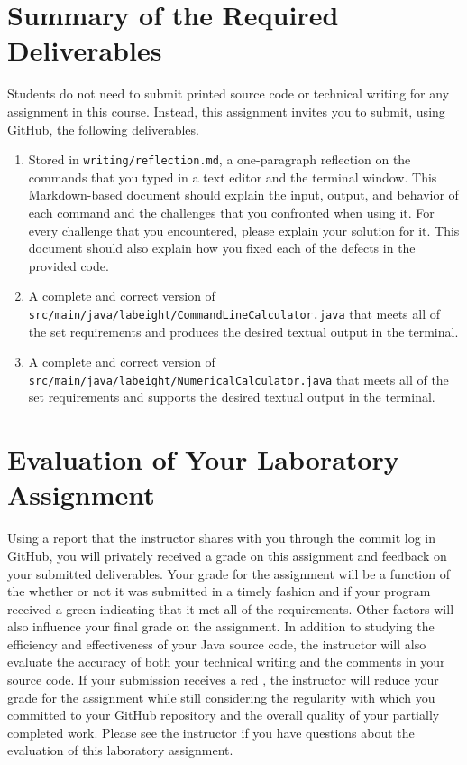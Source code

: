 \documentclass[11pt]{article}
\newcommand{\mainprogramsource}{\lstinline{src/main/java/labeight/CommandLineCalculator.java}}
\newcommand{\secondprogramsource}{\lstinline{src/main/java/labeight/NumericalCalculator.java}}
\newcommand{\reflection}{\lstinline{writing/reflection.md}}
\newcommand{\checkmark}{\ding{51}}
\newcommand{\naughtmark}{\ding{55}}
\begin{document}
\section*{Summary of the Required Deliverables}

\noindent Students do not need to submit printed source code or technical writing for any assignment in this course.
Instead, this assignment invites you to submit, using GitHub, the following deliverables.

\begin{enumerate}

  \setlength{\itemsep}{0in}

\item Stored in \reflection{}, a one-paragraph reflection on the commands that
  you typed in a text editor and the terminal window. This Markdown-based
  document should explain the input, output, and behavior of each command and
  the challenges that you confronted when using it. For every challenge that you
  encountered, please explain your solution for it. This document should also
  explain how you fixed each of the defects in the provided code.

\item A complete and correct version of \mainprogramsource{} that meets all of
  the set requirements and produces the desired textual output in the terminal.

\item A complete and correct version of \secondprogramsource{} that meets all of
  the set requirements and supports the desired textual output in the terminal.

\end{enumerate}

\section*{Evaluation of Your Laboratory Assignment}

Using a report that the instructor shares with you through the commit log in
GitHub, you will privately received a grade on this assignment and feedback on
your submitted deliverables. Your grade for the assignment will be a function of
the whether or not it was submitted in a timely fashion and if your program
received a green \checkmark{} indicating that it met all of the requirements.
Other factors will also influence your final grade on the assignment. In
addition to studying the efficiency and effectiveness of your Java source code,
the instructor will also evaluate the accuracy of both your technical writing
and the comments in your source code. If your submission receives a red
\naughtmark{}, the instructor will reduce your grade for the assignment while
still considering the regularity with which you committed to your GitHub
repository and the overall quality of your partially completed work. Please see
the instructor if you have questions about the evaluation of this laboratory
assignment.
\end{document}
